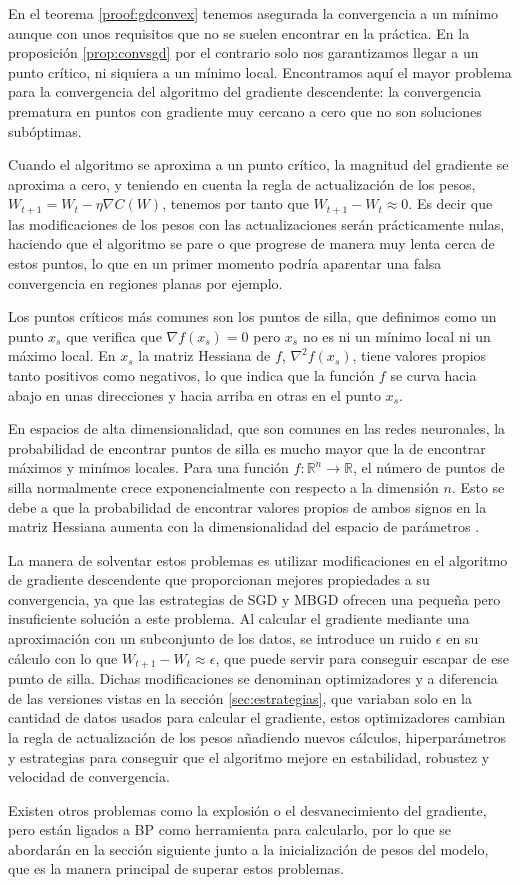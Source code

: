 En el teorema \ref{proof:gdconvex} tenemos asegurada la convergencia a un mínimo aunque con unos requisitos que no se suelen encontrar en la práctica. En la proposición \ref{prop:convsgd} por el contrario solo nos garantizamos llegar a un punto crítico, ni siquiera a un mínimo local. Encontramos aquí el mayor problema para la convergencia del algoritmo del gradiente descendente: la convergencia prematura en puntos con gradiente muy cercano a cero que no son soluciones subóptimas. 

Cuando el algoritmo se aproxima a un punto crítico, la magnitud del gradiente se aproxima a cero, y teniendo en cuenta la regla de actualización de los pesos, $W_{t+1}=W_t - \eta \nabla C(W)$, tenemos por tanto que $W_{t+1} - W_t \approx 0$. Es decir que las modificaciones de los pesos con las actualizaciones serán prácticamente nulas, haciendo que el algoritmo se pare o que progrese de manera muy lenta cerca de estos puntos, lo que en un primer momento podría aparentar una falsa convergencia en regiones planas por ejemplo. 

Los puntos críticos más comunes son los puntos de silla, que definimos como un punto $x_s$ que verifica que $\nabla f(x_s)=0$ pero $x_s$ no es ni un mínimo local ni un máximo local. En $x_s$ la matriz Hessiana de $f$, $\nabla^2 f(x_s)$, tiene valores propios tanto positivos como negativos, lo que indica que la función $f$ se curva hacia abajo en unas direcciones y hacia arriba en otras en el punto $x_s$.

En espacios de alta dimensionalidad, que son comunes en las redes neuronales, la probabilidad de encontrar puntos de silla es mucho mayor que la de encontrar máximos y minímos locales. Para una función $f:\mathbb{R}^n \rightarrow \mathbb{R}$, el número de puntos de silla normalmente crece exponencialmente con respecto a la dimensión $n$. Esto se debe a que la probabilidad de encontrar valores propios de ambos signos en la matriz Hessiana aumenta con la dimensionalidad del espacio de parámetros \cite{dauphin2014SaddlePoints}. 

La manera de solventar estos problemas es utilizar modificaciones en el algoritmo de gradiente descendente que proporcionan mejores propiedades a su convergencia, ya que las estrategias de SGD y MBGD ofrecen una pequeña pero insuficiente solución a este problema. Al calcular el gradiente mediante una aproximación con un subconjunto de los datos, se introduce un ruido $\epsilon$ en su cálculo con lo que $W_{t+1} - W_t \approx \epsilon$, que puede servir para conseguir escapar de ese punto de silla. Dichas modificaciones se denominan optimizadores y a diferencia de las versiones vistas en la sección \ref{sec:estrategias}, que variaban solo en la cantidad de datos usados para calcular el gradiente, estos optimizadores cambian la regla de actualización de los pesos añadiendo nuevos cálculos, hiperparámetros y estrategias para conseguir que el algoritmo mejore en estabilidad, robustez y velocidad de convergencia.


Existen otros problemas como la explosión o el desvanecimiento del gradiente, pero están ligados a BP como herramienta para calcularlo, por lo que se abordarán en la sección siguiente junto a la inicialización de pesos del modelo, que es la manera principal de superar estos problemas. 





